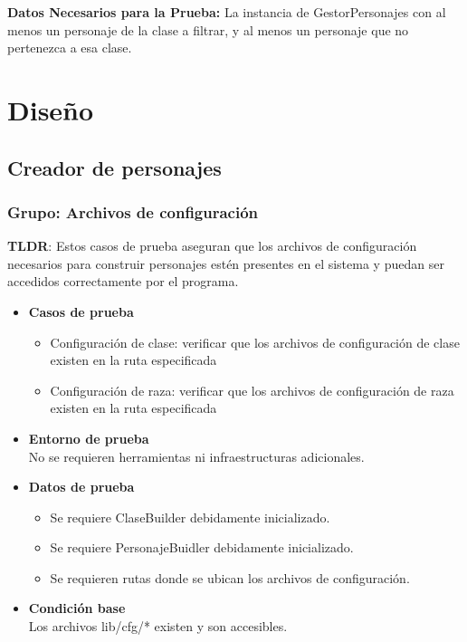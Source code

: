\documentclass{article}
\begin{document}
        \textbf{Datos Necesarios para la Prueba:}
            La instancia de GestorPersonajes con al menos un personaje de la clase a filtrar, y al menos un personaje que no pertenezca a esa clase.


\section{Diseño}
\subsection{Creador de personajes}
\subsubsection{Grupo: Archivos de configuración}
\textbf{TLDR}:
Estos casos de prueba aseguran que los archivos de configuración necesarios para construir personajes estén presentes en el sistema y puedan ser accedidos correctamente por el programa.

\begin{itemize}
	\item \textbf{Casos de prueba}
	\begin{itemize}
		\item Configuración de clase: verificar que los archivos de configuración de clase existen en la ruta especificada
		\item Configuración de raza: verificar que los archivos de configuración de raza existen en la ruta especificada
	\end{itemize}
	\item \textbf{Entorno de prueba}\\
	No se requieren herramientas ni infraestructuras adicionales.

	\item \textbf{Datos de prueba}
	\begin{itemize}
		\item 	Se requiere ClaseBuilder debidamente inicializado.
			\item Se requiere PersonajeBuidler debidamente inicializado.
			\item Se requieren rutas donde se ubican los archivos de configuración.
	\end{itemize}

	
	\item \textbf{Condición base}\\
	Los archivos lib/cfg/* existen y son accesibles. 
\end{itemize}
\end{document}
